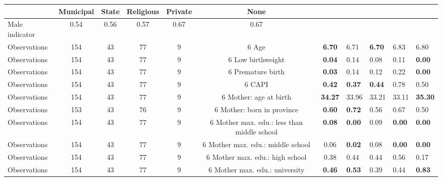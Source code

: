 \begin{tabular}{l c c c c c c }
\toprule
& \textbf{Municipal} & \textbf{State} & \textbf{Religious} & \textbf{Private} & \textbf{None} \\
\midrule
Male indicator &      0.54 &      0.56 &      0.57 &      0.67 &      0.67 \\
\midrule
Observations &       154 &        43 &        77 &         9 &         6
Age & \textbf{     6.70} &      6.71 & \textbf{     6.70} &      6.83 &      6.80 \\
\midrule
Observations &       154 &        43 &        77 &         9 &         6
Low birthweight & \textbf{     0.04} &      0.14 &      0.08 &      0.11 & \textbf{     0.00} \\
\midrule
Observations &       154 &        43 &        77 &         9 &         6
Premature birth & \textbf{     0.03} &      0.14 &      0.12 &      0.22 & \textbf{     0.00} \\
\midrule
Observations &       154 &        43 &        77 &         9 &         6
CAPI & \textbf{     0.42} & \textbf{     0.37} & \textbf{     0.44} &      0.78 &      0.50 \\
\midrule
Observations &       154 &        43 &        77 &         9 &         6
Mother: age at birth & \textbf{    34.27} &     33.96 &     33.21 &     33.11 & \textbf{    35.30} \\
\midrule
Observations &       153 &        43 &        76 &         9 &         6
Mother: born in province & \textbf{     0.60} & \textbf{     0.72} &      0.56 &      0.67 &      0.50 \\
\midrule
Observations &       154 &        43 &        77 &         9 &         6
Mother max. edu.: less than middle school & \textbf{     0.08} & \textbf{     0.00} &      0.09 & \textbf{     0.00} & \textbf{     0.00} \\
\midrule
Observations &       154 &        43 &        77 &         9 &         6
Mother max. edu.: middle school &      0.06 & \textbf{     0.02} &      0.08 & \textbf{     0.00} & \textbf{     0.00} \\
\midrule
Observations &       154 &        43 &        77 &         9 &         6
Mother max. edu.: high school &      0.38 &      0.44 &      0.44 &      0.56 &      0.17 \\
\midrule
Observations &       154 &        43 &        77 &         9 &         6
Mother max. edu.: university & \textbf{     0.46} & \textbf{     0.53} &      0.39 &      0.44 & \textbf{     0.83} \\

\end{tabular}

